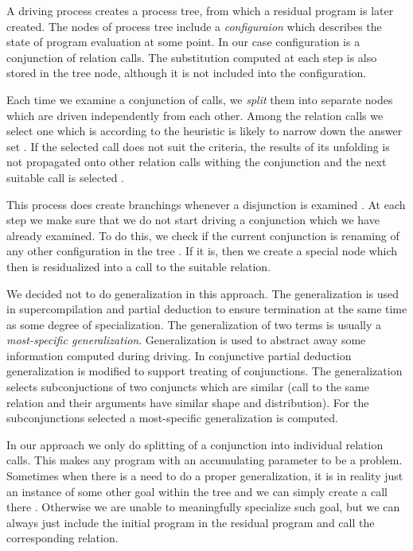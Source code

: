 A driving process creates a process tree, from which a residual program is later created.
The nodes of process tree include a \emph{configuraion} which describes the state of program evaluation at some point.
In our case configuration is a conjunction of relation calls.
The substitution computed at each step is also stored in the tree node, although it is not included into the configuration.

Each time we examine a conjunction of calls, we \emph{split} them into separate nodes which are driven independently from each other.
Among the relation calls we select one which is according to the heuristic is likely to narrow down the answer set .
If the selected call does not suit the criteria, the results of its unfolding is not propagated onto other relation calls withing the conjunction and the next suitable call is selected .

This process does create branchings whenever a disjunction is examined .
At each step we make sure that we do not start driving a conjunction which we have already examined.
To do this, we check if the current conjunction is renaming of any other configuration in the tree .
If it is, then we create a special node which then is residualized into a call to the suitable relation.

We decided not to do generalization in this approach.
The generalization is used in supercompilation and partial deduction to ensure termination at the same time as some degree of specialization.
The generalization of two terms is usually a \emph{most-specific generalization}.
Generalization is used to abstract away some information computed during driving.
In conjunctive partial deduction generalization is modified to support treating of conjunctions.
The generalization selects subconjuctions of two conjuncts which are similar (call to the same relation and their arguments have similar shape and distribution).
For the subconjunctions selected a most-specific generalization is computed.

In our approach we only do splitting of a conjunction into individual relation calls.
This makes any program with an accumulating parameter to be a problem.
Sometimes when there is a need to do a proper generalization, it is in reality just an instance of some other goal within the tree and we can simply create a call there .
Otherwise we are unable to meaningfully specialize such goal, but we can always just include the initial program in the residual program and call the corresponding relation.


